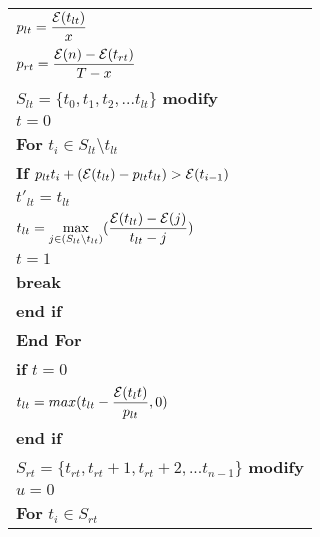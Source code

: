 \begin{table}
\begin{minipage}[b]{8cm}
\begin{tabular}{p{7cm}}
\hspace{4mm}$p_{lt} = \dfrac{\mathcal{E}(t_{lt})}{x}$
\\
\hspace{4mm}$p_{rt} = \dfrac{\mathcal{E}(n)-\mathcal{E}(t_{rt})}{T-x}$
\\
\hspace{4mm}$S_{lt} = \{t_0,t_1,t_2,...t_{lt}\}$ \textbf{modify}
\\
\hspace{4mm}$t=0$
\\
\hspace{4mm}\textbf{For} $t_i \in S_{lt}\setminus t_{lt}$
\\
\hspace{7mm}\textbf{If} $p_{lt}t_i + (\mathcal{E}(t_{lt}) - p_{lt}t_{lt}) > \mathcal{E}(t_{i-1})$
\\
\hspace{10mm}$t'_{lt} = t_{lt}$
\\
\hspace{10mm}$t_{lt} = \displaystyle \max_{j\in(S_{lt}\setminus {t_{lt}})}(\dfrac{\mathcal{E}(t_{lt}) - \mathcal{E}(j)}{t_{lt}-j})$
\\
\hspace{10mm}$t=1$
\\
\hspace{10mm}\textbf{break}
\\
\hspace{7mm}\textbf{end if}
\\
\hspace{4mm}\textbf{End For}
\\
\hspace{4mm}\textbf{if} $t=0$
\\
\hspace{7mm}$t_{lt} = max(t_{lt} - \dfrac{\mathcal{E}(t_lt)}{p_{lt}} , 0)$
\\
\hspace{4mm}\textbf{end if}
\\
\hspace{4mm}$S_{rt} = \{t_{rt},t_{rt}+1,t_{rt}+2,...t_{n-1}\}$ \textbf{modify}
\\
\hspace{4mm}$u=0$
\\
\hspace{4mm}\textbf{For} $t_i \in S_{rt}$
\\

\end{tabular}
\end{minipage}
\end{table}
